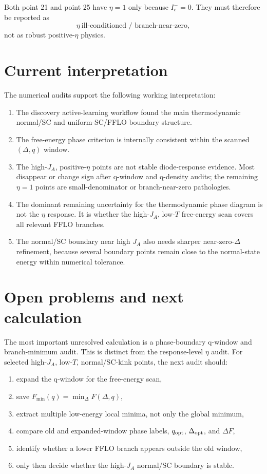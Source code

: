 \documentclass[11pt]{article}
\begin{document}
Both point 21 and point 25 have \(\eta=1\) only because \(I_c^-=0\).  They must
therefore be reported as
\[
\eta\ \text{ill-conditioned / branch-near-zero},
\]
not as robust positive-\(\eta\) physics.

\section*{Current interpretation}

The numerical audits support the following working interpretation:

\begin{enumerate}
  \item The discovery active-learning workflow found the main thermodynamic
        normal/SC and uniform-SC/FFLO boundary structure.
  \item The free-energy phase criterion is internally consistent within the
        scanned \((\Delta,q)\) window.
  \item The high-\(J_A\), positive-\(\eta\) points are not stable diode-response
        evidence.  Most disappear or change sign after q-window and q-density
        audits; the remaining \(\eta=1\) points are small-denominator or
        branch-near-zero pathologies.
  \item The dominant remaining uncertainty for the thermodynamic phase diagram
        is not the \(\eta\) response.  It is whether the high-\(J_A\), low-\(T\)
        free-energy scan covers all relevant FFLO branches.
  \item The normal/SC boundary near high \(J_A\) also needs sharper
        near-zero-\(\Delta\) refinement, because several boundary points remain
        close to the normal-state energy within numerical tolerance.
\end{enumerate}

\section*{Open problems and next calculation}

The most important unresolved calculation is a phase-boundary q-window and
branch-minimum audit.  This is distinct from the response-level \(\eta\) audit.
For selected high-\(J_A\), low-\(T\), normal/SC-kink points, the next audit
should:

\begin{enumerate}
  \item expand the q-window for the free-energy scan,
  \item save \(F_{\min}(q)=\min_\Delta F(\Delta,q)\),
  \item extract multiple low-energy local minima, not only the global minimum,
  \item compare old and expanded-window phase labels, \(q_{\rm opt}\),
        \(\Delta_{\rm opt}\), and \(\Delta F\),
  \item identify whether a lower FFLO branch appears outside the old window,
  \item only then decide whether the high-\(J_A\) normal/SC boundary is stable.
\end{enumerate}
\end{document}
